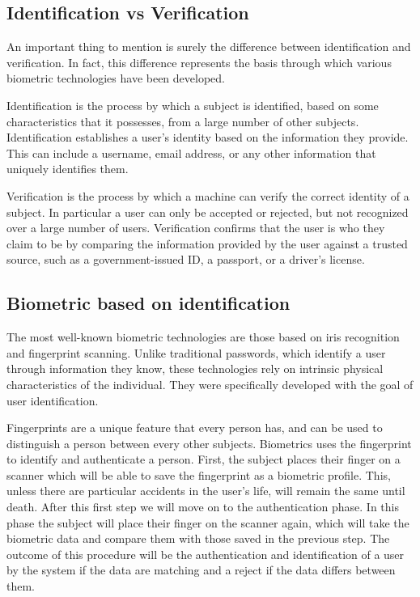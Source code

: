 \documentclass{article}
\begin{document}
\subsection{Identification vs Verification}

An important thing to mention is surely the difference between identification and verification.
In fact, this difference represents the basis through which various biometric technologies have been developed.

Identification is the process by which a subject is identified, based on some characteristics that it possesses, from a large number of other subjects.
Identification establishes a user's identity based on the information they provide. 
This can include a username, email address, or any other information that uniquely identifies them.

Verification is the process by which a machine can verify the correct identity of a subject.
In particular a user can only be accepted or rejected, but not recognized over a large number of users.
Verification confirms that the user is who they claim to be by comparing the information provided by the user against a trusted source, such as a government-issued ID, a passport, or a driver's license.

\subsection{Biometric based on identification}

The most well-known biometric technologies are those based on iris recognition and fingerprint scanning. 
Unlike traditional passwords, which identify a user through information they know, these technologies rely on intrinsic physical characteristics of the individual.
They were specifically developed with the goal of user identification.

Fingerprints are a unique feature that every person has, and can be used to distinguish a person between every other subjects. 
Biometrics uses the fingerprint to identify and authenticate a person.
First, the subject places their finger on a scanner which will be able to save the fingerprint as a biometric profile.
This, unless there are particular accidents in the user's life, will remain the same until death.
After this first step we will move on to the authentication phase.
In this phase the subject will place their finger on the scanner again, which will take the biometric data and compare them with those saved in the previous step.
The outcome of this procedure will be the authentication and identification of a user by the system if the data are matching and a reject if the data differs between them.
\end{document}
